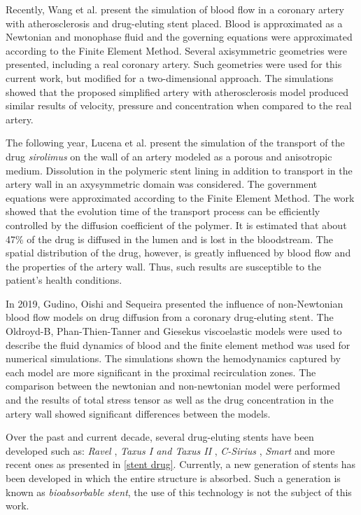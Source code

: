 \medskip
Recently, Wang et al. \cite{wang2017} present the simulation
 of blood flow in a coronary artery with atherosclerosis and
 drug-eluting stent placed. Blood is approximated as a Newtonian and
 monophase fluid and the governing equations were approximated
 according to the Finite Element Method. Several axisymmetric
 geometries were presented, including a real coronary artery.
 Such geometries were used for this current work, but modified
 for a two-dimensional approach. The simulations showed that
 the proposed simplified artery with atherosclerosis model
 produced similar results of velocity, pressure and concentration
 when compared to the real artery.

\medskip
The following year, Lucena et al. \cite{lucena2018} present 
the simulation of the transport of the drug \textit{sirolimus}
 on the wall of an artery modeled as a porous and anisotropic medium.
 Dissolution in the polymeric stent lining in addition to transport
 in the artery wall in an axysymmetric domain was considered.
 The government equations were approximated according to
 the Finite Element Method. The work showed that the evolution time
 of the transport process can be efficiently controlled by
 the diffusion coefficient of the polymer. It is estimated that
 about 47\% of the drug is diffused in the lumen and is lost in
 the bloodstream. The spatial distribution of the drug, however,
 is greatly influenced by blood flow and the properties of 
the artery wall. Thus, such results are susceptible to the
 patient's health conditions.

\medskip
In 2019, Gudino, Oishi and Sequeira \cite{gudino2019} presented
the influence of non-Newtonian blood flow models on drug
diffusion from a coronary drug-eluting stent. 
The Oldroyd-B, Phan-Thien-Tanner and Giesekus viscoelastic models
were used to describe the fluid dynamics of blood and the finite
element method was used for numerical simulations. The simulations
shown the hemodynamics captured by each model are more significant
in the proximal recirculation zones. The comparison between the
newtonian and non-newtonian model were performed and
the results of total stress tensor as well as the drug concentration in the artery
wall showed significant differences between the models. 


\medskip
Over the past and current decade, several drug-eluting stents
 have been developed such as: \textit{Ravel} \cite{morice2002},
 \textit{Taxus I and Taxus II} \cite{grube2003} \cite{colombo2003},
 \textit{C-Sirius} \cite{schampaert2004},
 \textit{Smart} \cite{ardissino2004} and
 more recent ones as presented in \ref{stent drug}. 
Currently, a new generation of stents has been developed
 in which the entire structure is absorbed. 
Such a generation is known as \textit{bioabsorbable stent}, 
the use of this technology is not the subject of this work.


